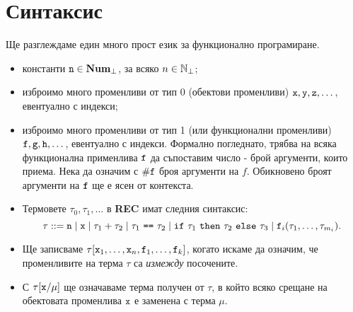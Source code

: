 \section{Синтаксис}
Ще разглеждаме един много прост език за функционално програмиране.
\begin{itemize}
\item
  константи $\texttt{n}\in\mathbf{Num}_\bot$, за всяко $n \in \mathbb{N}_\bot$;
\item
  изброимо много променливи от тип 0 (обектови променливи) $\texttt{x}, \texttt{y}, \texttt{z}, \dots$, евентуално с индекси;
\item
  изброимо много променливи от тип 1 (или функционални променливи) $\texttt{f},\texttt{g},\texttt{h},\dots$, евентуално с индекси. 
  Формално погледнато, трябва на всяка функционална применлива $\texttt{f}$
  да съпоставим число - брой аргументи, които приема. Нека да означим с $\#\texttt{f}$ броя аргументи на $f$.
  Обикновено броят аргументи на $\texttt{f}$ ще е ясен от контекста.
\item
  Термовете $\tau_0,\tau_1,\dots$ в {\bf REC} имат следния синтаксис:
  \[\tau ::= \texttt{n} \mid \texttt{x} \mid \tau_1 + \tau_2 \mid \tau_1\ \texttt{==}\ \tau_2 \mid \texttt{if}\ \tau_1\ \texttt{then}\ \tau_2\ \texttt{else}\ \tau_3 \mid \texttt{f}_i(\tau_1,\dots,\tau_{m_i}).\]
\item
  Ще записваме $\tau[\texttt{x}_1,\dots,\texttt{x}_n,\texttt{f}_1,\dots,\texttt{f}_k]$, когато искаме да означим, че променливите
  на терма $\tau$ са {\em измежду} посочените.
\item
  С $\tau[\texttt{x}/\mu]$ ще означаваме терма получен от $\tau$, в който всяко срещане на обектовата променлива $\texttt{x}$
  е заменена с терма $\mu$.
\end{itemize}


